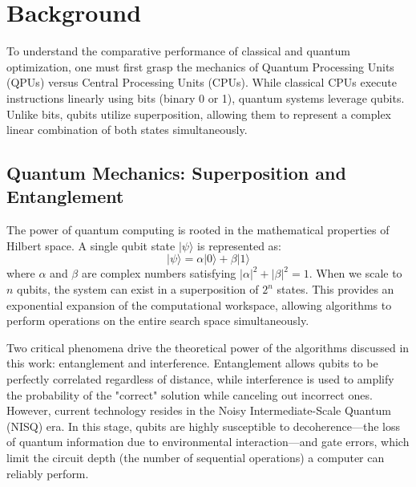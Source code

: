 \documentclass[12pt]{article}
\begin{document}
\section{Background}
To understand the comparative performance of classical and quantum optimization, one must first grasp the mechanics of Quantum Processing Units (QPUs) versus Central Processing Units (CPUs). While classical CPUs execute instructions linearly using bits (binary 0 or 1), quantum systems leverage qubits. Unlike bits, qubits utilize superposition, allowing them to represent a complex linear combination of both states simultaneously.

\subsection{Quantum Mechanics: Superposition and Entanglement}
The power of quantum computing is rooted in the mathematical properties of Hilbert space. A single qubit state $|\psi\rangle$ is represented as:
$$ |\psi\rangle = \alpha|0\rangle + \beta|1\rangle $$
where $\alpha$ and $\beta$ are complex numbers satisfying $|\alpha|^2 + |\beta|^2 = 1$. When we scale to $n$ qubits, the system can exist in a superposition of $2^n$ states. This provides an exponential expansion of the computational workspace, allowing algorithms to perform operations on the entire search space simultaneously.

Two critical phenomena drive the theoretical power of the algorithms discussed in this work: entanglement and interference. Entanglement allows qubits to be perfectly correlated regardless of distance, while interference is used to amplify the probability of the "correct" solution while canceling out incorrect ones. However, current technology resides in the Noisy Intermediate-Scale Quantum (NISQ) era. In this stage, qubits are highly susceptible to decoherence—the loss of quantum information due to environmental interaction—and gate errors, which limit the circuit depth (the number of sequential operations) a computer can reliably perform.
\end{document}
